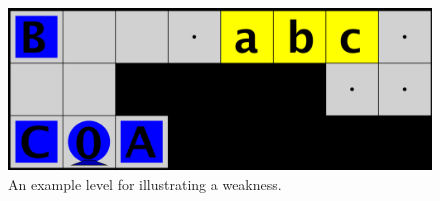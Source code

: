 \begin{figure}[h!]
  \centering
  \includegraphics[width=.6\columnwidth]{graphics/ordering_issue.png}
  \caption{\label{fig:examplelev}An example level for illustrating a weakness.}
\end{figure}

